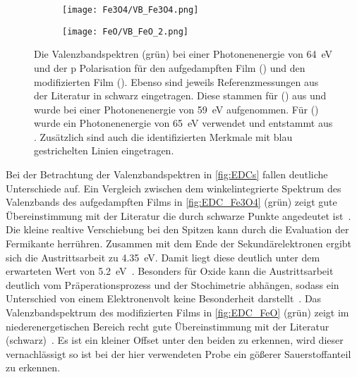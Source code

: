         \begin{figure}
            \begin{subfigure}[t]{0.48\textwidth}
                \centering
                \texttt{[image: Fe3O4/VB\_Fe3O4.png]}
                \subcaption{}
                \label{fig:EDC_Fe3O4}
            \end{subfigure}
            \begin{subfigure}[t]{0.48\textwidth}
                \centering
                \texttt{[image: FeO/VB\_FeO\_2.png]}
                \subcaption{}
                \label{fig:EDC_FeO}
            \end{subfigure}
            \caption{Die Valenzbandspektren (grün) bei einer Photonenenergie von \SI{64}{\electronvolt} und der p Polarisation für den aufgedampften Film () und den modifizierten Film ().
            Ebenso sind jeweils Referenzmessungen aus der Literatur in schwarz eingetragen.
            Diese stammen für () aus \cite{FeO_35} und wurde bei einer Photonenenergie von \SI{59}{\electronvolt} aufgenommen.
            Für () wurde ein Photonenenergie von \SI{65}{\electronvolt} verwendet und entstammt aus \cite{FeO_14}.
            Zusätzlich sind auch die identifizierten Merkmale mit blau gestrichelten Linien eingetragen.}
            \label{fig:EDCs}
        \end{figure}
        Bei der Betrachtung der Valenzbandspektren in \autoref{fig:EDCs} fallen deutliche Unterschiede auf.     
        Ein Vergleich zwischen dem winkelintegrierte Spektrum des Valenzbands des aufgedampften Films in \autoref{fig:EDC_Fe3O4} (grün) zeigt gute Übereinstimmung mit der Literatur die durch schwarze Punkte angedeutet ist~\cite{FeO_35}.
        Die kleine realtive Verschiebung bei den Spitzen kann durch die Evaluation der Fermikante herrühren.
        Zusammen mit dem Ende der Sekundärelektronen ergibt sich die Austrittsarbeit zu \SI{4.35}{\electronvolt}.
        Damit liegt diese deutlich unter dem erwarteten Wert von \SI{5.2}{\electronvolt}~\cite{FeO_40}.
        Besonders für Oxide kann die Austrittsarbeit deutlich vom Präperationsprozess und der Stochimetrie abhängen, sodass ein Unterschied von einem Elektronenvolt keine Besonderheit darstellt~\cite{IF_11}.
        Das Valenzbandspektrum des modifizierten Films in \autoref{fig:EDC_FeO} (grün) zeigt im niederenergetischen Bereich recht gute Übereinstimmung mit der Literatur (schwarz)~\cite{FeO_14}.
        Es ist ein kleiner Offset unter den beiden zu erkennen, wird dieser vernachlässigt so ist bei der hier verwendeten Probe ein gößerer Sauerstoffanteil zu erkennen.
